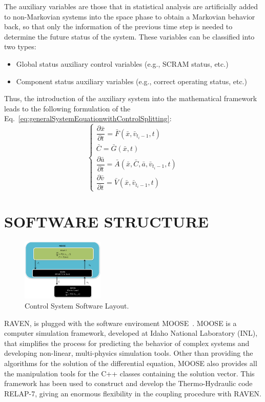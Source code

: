 \documentclass{anstrans}
\begin{document}
The auxiliary variables are those that in statistical analysis are artificially added to non-Markovian systems into the space phase to obtain a Markovian behavior back, so that only the information of the previous time step is needed to determine the future status of the system.
These variables can be classified into two types: 
\begin{itemize}
\item Global status auxiliary control variables (e.g., SCRAM status, etc.)
\item Component status auxiliary variables (e.g., correct operating status, etc.)
\end{itemize}
Thus, the introduction of the auxiliary system into the mathematical framework leads to the following formulation of the Eq.~\ref{eq:generalSystemEquationwithControlSplitting}:
\begin{equation}
\begin{cases} 
\dfrac{\partial \bar{x}}{\partial t} = \bar{F}(\bar{x},\bar{v}_{t_{i}-1},t) \\
\bar{C} = \bar{G}(\bar{x},t) \\ 
\dfrac{\partial \bar{a}}{\partial t} = \bar{A}(\bar{x},\bar{C},\bar{a},\bar{v}_{t_{i}-1},t) \\
\dfrac{\partial \bar{v}}{\partial t} = \bar{V}(\bar{x},\bar{v}_{t_{i}-1},t) 
\end{cases}
\label{eq:generalSystemEquationwithControlSplittingAndAux}
\end{equation}


\section{SOFTWARE STRUCTURE}
\begin{figure}
\centering
\includegraphics[width=0.35\textwidth]{figures/ControlSystemSoftwareLayout.pdf}
\caption{Control System Software Layout.}
\label{fig:ControlSoftwareLayout}
\end{figure}
RAVEN, is plugged with the software enviroment MOOSE~\cite{MOOSE}. MOOSE is a computer simulation framework,  developed at Idaho National Laboratory (INL), that simplifies the process for predicting the behavior of complex systems and developing non-linear, multi-physics simulation tools. Other than providing the algorithms for the solution of the differential equation, MOOSE also provides all the manipulation tools for the C++ classes containing the solution vector. This framework has been used to construct and develop the Thermo-Hydraulic code RELAP-7, giving an enormous flexibility in the coupling procedure with RAVEN. 
\end{document}
